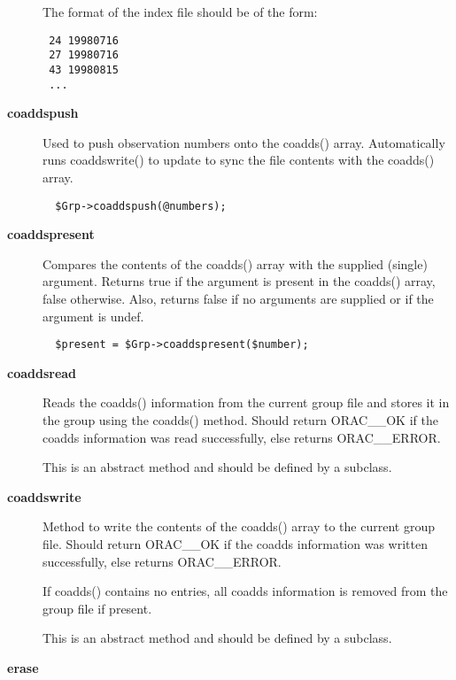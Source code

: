 \begin{description}
The format of the index file should be of the form:

\begin{verbatim}
 24 19980716 
 27 19980716 
 43 19980815 
 ...
\end{verbatim}

\item[\textbf{coaddspush}] \mbox{}

Used to push observation numbers onto the coadds() array. Automatically
runs coaddswrite() to update to sync the file contents with the coadds()
array.

\begin{verbatim}
  $Grp->coaddspush(@numbers);
\end{verbatim}

\item[\textbf{coaddspresent}] \mbox{}

Compares the contents of the coadds() array with the supplied (single)
argument. Returns true if the argument is present in the coadds()
array, false otherwise. Also, returns false if no arguments are supplied
or if the argument is undef.

\begin{verbatim}
  $present = $Grp->coaddspresent($number);
\end{verbatim}

\item[\textbf{coaddsread}] \mbox{}

Reads the coadds() information from the current group file and stores
it in the group using the coadds() method.
Should return ORAC\_\_OK if the coadds information was read successfully,
else returns ORAC\_\_ERROR.



This is an abstract method and should be defined by a subclass.


\item[\textbf{coaddswrite}] \mbox{}

Method to write the contents of the coadds() array to the current
group file. Should return ORAC\_\_OK if the coadds information was written
successfully, else returns ORAC\_\_ERROR.



If coadds() contains no entries, all coadds information is removed from
the group file if present.



This is an abstract method and should be defined by a subclass.


\item[\textbf{erase}] \mbox{}


\end{description}
